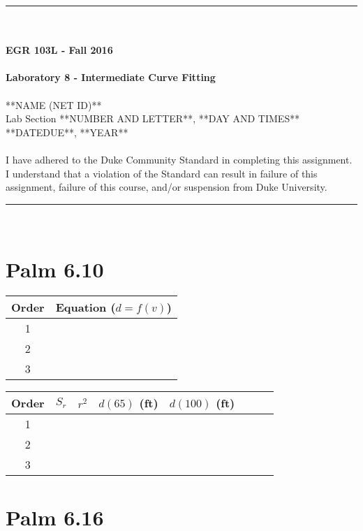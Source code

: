 \documentclass{article}
\begin{document}
\begin{center}
\rule{6.5in}{0.5mm}\\~\\
{\bf \large EGR 103L - Fall 2016}\\~\\
{\huge \bf Laboratory 8 - Intermediate Curve Fitting}\\~\\
**NAME (NET ID)**\\
Lab Section **NUMBER AND LETTER**, **DAY AND TIMES**\\
**DATEDUE**, **YEAR**\\~\\
{\small I have adhered to the Duke Community Standard in completing
  this assignment.  I understand that a violation of the Standard can
  result in failure of this assignment, failure of this course, and/or
  suspension from Duke University.} 
\rule{6.5in}{0.5mm}\\
\end{center}
\tableofcontents
\listoffigures
\pagebreak
\renewcommand{\arraystretch}{1.5}

\section{Palm 6.10}
\begin{center}
\begin{tabular}{|c|c|} \hline
Order & Equation ($d=f(v)$)\\ \hline
1 &  \\ \hline
2 &  \\ \hline
3 &  \\ \hline
\end{tabular}
\end{center}

\begin{center}
\begin{tabular}{|c|c|c|c|c|c|c|c|} \hline
Order & $S_r$ & $r^2$ & $d(65)$ (ft) &
$d(100)$ (ft)\\ \hline
1 &  &  &  & \\ \hline
2 &  &  &  & \\ \hline
3 &  &  &  & \\ \hline
\end{tabular}
\end{center}


\section{Palm 6.16}
\end{document}
